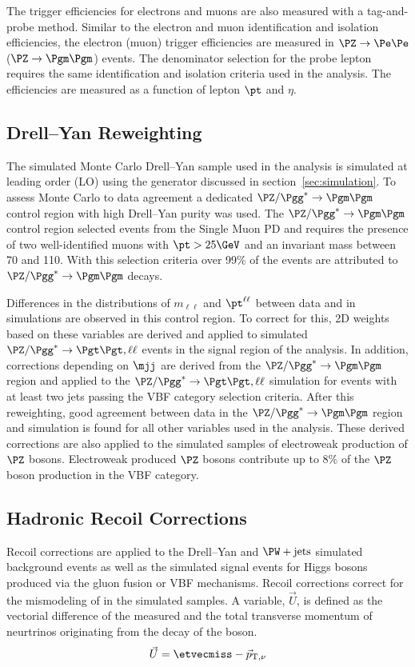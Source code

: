 The trigger efficiencies for electrons and muons are also measured with a tag-and-probe method.
Similar to the electron and muon identification and isolation efficiencies, the 
electron (muon) trigger efficiencies are measured in $\PZ\to\Pe\Pe$ ($\PZ\to\Pgm\Pgm$) events.
The denominator selection for the probe lepton requires the same identification and
isolation criteria used in the analysis. The efficiencies are measured as a function of
lepton $\pt$ and $\eta$.



\subsection{Drell--Yan Reweighting}
\label{sec:htt_dy_reweighting}
The simulated Monte Carlo Drell--Yan sample used in the analysis is simulated at leading order (LO)
using the \aMCATNLO generator discussed in section~\ref{sec:simulation}. To assess Monte Carlo to
data agreement a dedicated $\PZ/\Pgg^*\to\Pgm\Pgm$ control region with high Drell--Yan purity was used.
The $\PZ/\Pgg^*\to\Pgm\Pgm$ control region selected events from the Single Muon PD and requires the 
presence of two well-identified muons with $\pt > 25 \GeV$ and an invariant mass between 70 and 110\GeV.
With this selection criteria over 99\% of the events are attributed to $\PZ/\Pgg^*\to\Pgm\Pgm$ decays.

Differences in the distributions of $m_{\ell\ell}$ and $\pt^{\ell\ell}$ between data and 
in simulations are observed in this control region. To correct for this, 2D weights based on these variables 
are derived and applied to simulated $\PZ/\Pgg^*\to\Pgt\Pgt, \ell\ell$ events in the signal region of the analysis. 
In addition, corrections depending on $\mjj$ are derived from the $\PZ/\Pgg^*\to\Pgm\Pgm$ region and 
applied to the $\PZ/\Pgg^*\to\Pgt\Pgt, \ell\ell$ simulation for events with at least two jets passing the 
VBF category selection criteria. After this reweighting, good agreement between data in the 
$\PZ/\Pgg^*\to\Pgm\Pgm$ region and simulation is found for all other variables used in the analysis.
These derived corrections are also applied to the simulated samples of electroweak production of $\PZ$ 
bosons. Electroweak produced $\PZ$ bosons contribute up to 8\% of the $\PZ$ boson production in the VBF category.



\subsection{Hadronic Recoil Corrections}
Recoil corrections are applied to the Drell--Yan and $\PW+\text{jets}$ simulated background events 
as well as the simulated signal events for 
Higgs bosons produced via the gluon fusion or VBF mechanisms. Recoil corrections correct for the
mismodeling of \etvecmiss in the simulated samples. A variable, $\vec{U}$, is defined as the 
vectorial difference of the measured \etvecmiss and the total transverse momentum of neurtrinos
originating from the decay of the boson.
\begin{equation}
\vec{U} = \etvecmiss - \vec{p}_{\text{T},\nu}
\end{equation}

